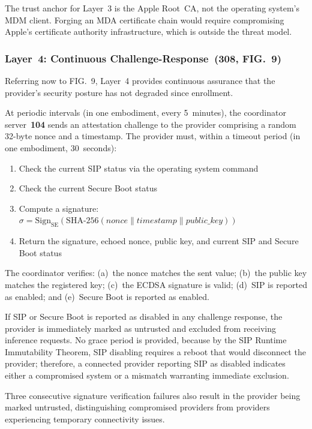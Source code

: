 \documentclass[11pt,letterpaper]{article}
\begin{document}
The trust anchor for Layer~3 is the Apple Root~CA, not the operating system's MDM client. Forging an MDA certificate chain would require compromising Apple's certificate authority infrastructure, which is outside the threat model.

\subsubsection{Layer~4: Continuous Challenge-Response~(308, FIG.~9)}

Referring now to FIG.~9, Layer~4 provides continuous assurance that the provider's security posture has not degraded since enrollment.

At periodic intervals (in one embodiment, every 5~minutes), the coordinator server~\textbf{104} sends an attestation challenge to the provider comprising a random 32-byte nonce and a timestamp. The provider must, within a timeout period (in one embodiment, 30~seconds):

\begin{enumerate}[nosep]
\item Check the current SIP status via the operating system command
\item Check the current Secure Boot status
\item Compute a signature: $\sigma = \mathrm{Sign}_{\mathrm{SE}}(\mathrm{SHA\text{-}256}(\mathit{nonce} \| \mathit{timestamp} \| \mathit{public\_key}))$
\item Return the signature, echoed nonce, public key, and current SIP and Secure Boot status
\end{enumerate}

The coordinator verifies: (a)~the nonce matches the sent value; (b)~the public key matches the registered key; (c)~the ECDSA signature is valid; (d)~SIP is reported as enabled; and (e)~Secure Boot is reported as enabled.

If SIP or Secure Boot is reported as disabled in any challenge response, the provider is immediately marked as untrusted and excluded from receiving inference requests. No grace period is provided, because by the SIP Runtime Immutability Theorem, SIP disabling requires a reboot that would disconnect the provider; therefore, a connected provider reporting SIP as disabled indicates either a compromised system or a mismatch warranting immediate exclusion.

Three consecutive signature verification failures also result in the provider being marked untrusted, distinguishing compromised providers from providers experiencing temporary connectivity issues.
\end{document}
